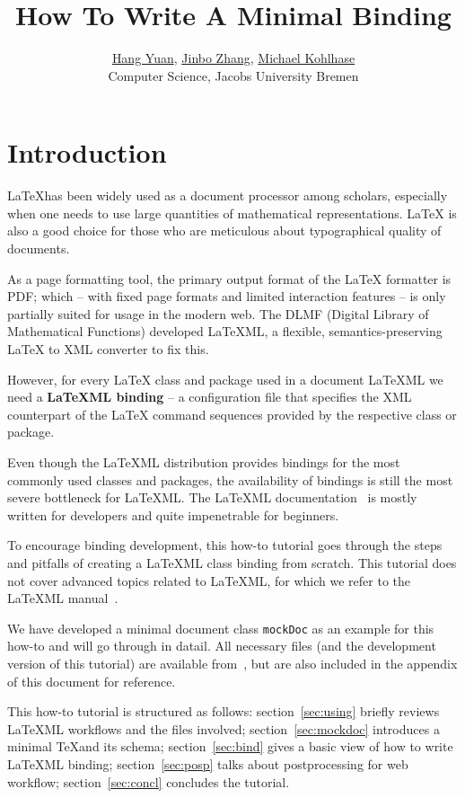 \documentclass[a4paper]{article}
\title{\textbf{How To Write A Minimal \latexml Binding}}
\author{\href{mailto:h.yuan@jacobs-university.de}{Hang Yuan}, 
	\href{mailto:jin.zhang@jacobs-university.de}{Jinbo Zhang},
        \href{mailto:m.kohlhase@jacobs-university.de}{Michael Kohlhase}\\
        Computer Science, Jacobs University Bremen}
\def\latexml{{\LaTeX}ML\xspace}
\begin{document}
\maketitle

\section{Introduction}\label{sec:intro}

{\LaTeX}has been widely used as a document processor among scholars, especially when one
needs to use large quantities of mathematical representations. {\LaTeX} is also a good
choice for those who are meticulous about typographical quality of documents.

As a page formatting tool, the primary output format of the {\LaTeX} formatter is PDF;
which -- with fixed page formats and limited interaction features -- is only partially
suited for usage in the modern web. The DLMF (Digital Library of Mathematical Functions)
developed \latexml, a flexible, semantics-preserving {\LaTeX} to XML converter to fix
this.

However, for every {\LaTeX} class and package used in a document \latexml we need a
\textbf{\latexml binding} -- a configuration file that specifies the XML counterpart of
the {\LaTeX} command sequences provided by the respective class or package. 

Even though the \latexml distribution provides bindings for the most commonly used classes
and packages, the availability of bindings is still the most severe bottleneck for
\latexml. The \latexml documentation~\cite{LaTeXML:manual} is mostly written for developers and
quite impenetrable for beginners.

To encourage binding development, this how-to tutorial goes through the steps and pitfalls
of creating a \latexml class binding from scratch. This tutorial does not cover advanced
topics related to \latexml, for which we refer to the \latexml manual~\cite{LaTeXML:manual}.

We have developed a minimal document class \lstinline|mockDoc| as an example for this
how-to and will go through in datail. All necessary files (and the development
version of this tutorial) are available from~\cite{mockDoc:git}, but are also included in
the appendix of this document for reference.

This how-to tutorial is structured as follows: section~\ref{sec:using} briefly reviews
\latexml workflows and the files involved; section~\ref{sec:mockdoc} introduces a minimal \TeX and its 
schema; section~\ref{sec:bind} gives a basic view of how to write \latexml binding; section~\ref{sec:posp} talks about postprocessing for web workflow; section~\ref{sec:concl} concludes the tutorial.
\end{document}

